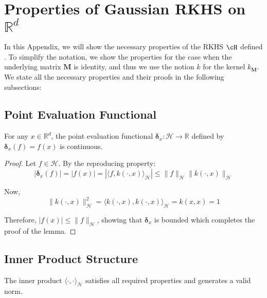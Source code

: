 \section{Properties of Gaussian RKHS on $\mathbb{R}^d$}\label{app: properties}
In this Appendix, we will show the necessary properties of the RKHS $\cH$ defined . To simplify the notation, we show the properties for the case when the underlying matrix $\textbf{M}$ is identity, and thus we use the notion $k$ for the kernel $k_{\textbf{M}}$. We state all the necessary properties and their proofs in the following subsections: %


\subsection{Point Evaluation Functional}

\begin{lemma}
For any $x \in \mathbb{R}^d$, the point evaluation functional $\boldsymbol{\delta}_x: \mathcal{H} \to \mathbb{R}$ defined by $\boldsymbol{\delta}_x(f) = f(x)$ is continuous.
\end{lemma}

\begin{proof}
Let $f \in \mathcal{H}$. By the reproducing property:
$$|\boldsymbol{\delta}_x(f)| = |f(x)| = |\langle f, k(\cdot,x)\rangle_\mathcal{H}| \leq \|f\|_\mathcal{H} \|k(\cdot,x)\|_\mathcal{H}$$

Now, 
$$\|k(\cdot,x)\|^2_\mathcal{H} = \langle k(\cdot,x), k(\cdot,x)\rangle_\mathcal{H} = k(x,x) = 1$$

Therefore, $|f(x)| \leq \|f\|_\mathcal{H}$, showing that $\boldsymbol{\delta}_x$ is bounded which completes the proof of the lemma. 
\end{proof}

\subsection{Inner Product Structure}
\begin{lemma}
The inner product $\langle \cdot, \cdot \rangle_\mathcal{H}$ satisfies all required properties and generates a valid norm.    
\end{lemma}

